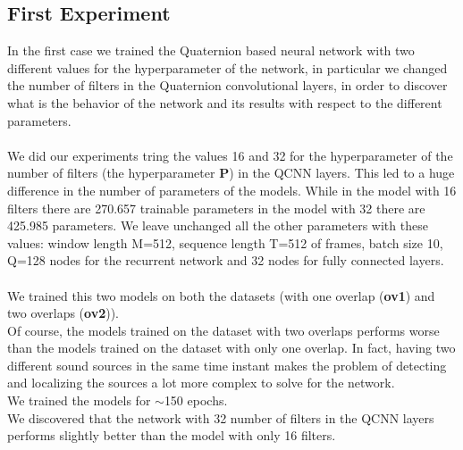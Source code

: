 \documentclass{article}
\begin{document}
    \subsection*{First Experiment}
    In the first case we trained the Quaternion based neural network with two different values for the hyperparameter of the network, in particular we changed the number of filters in the Quaternion convolutional layers, in order to discover what is the behavior of the network and its results with respect to the different parameters.
    \\ \\ We did our experiments tring the values 16 and 32 for the hyperparameter of the number of filters (the hyperparameter \textbf{P}) in the QCNN layers.
    This led to a huge difference in the number of parameters of the models. While in the model with 16 filters there are 270.657 trainable parameters in the model with 32 there are 425.985 parameters.
    We leave unchanged all the other parameters with these values: window length M=512, sequence length T=512 of frames, batch size 10, Q=128 nodes for the recurrent network and 32 nodes for fully connected layers.
    \\  \\ We trained this two models on both the datasets (with one overlap (\textbf{ov1}) and two overlaps (\textbf{ov2})).\\
    Of course, the models trained on the dataset with two overlaps performs worse than the models trained on the dataset with only one overlap. In fact, having two different sound sources in the same time instant makes the problem of detecting and localizing the sources a lot more complex to solve for the network.
	\\ We trained the models for $\sim$150 epochs.
    \\ We discovered that the network with 32 number of filters in the QCNN layers performs slightly better than the model with only 16 filters.
\end{document}
